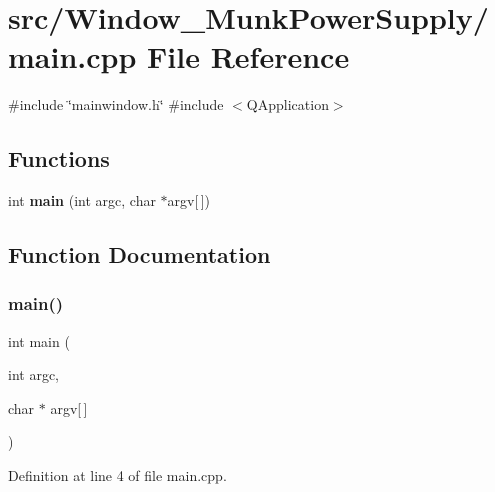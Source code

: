 \section{src/\+Window\+\_\+\+Munk\+Power\+Supply/main.cpp File Reference}
\label{_window___munk_power_supply_2main_8cpp}
{\ttfamily \#include \char`\"{}mainwindow.\+h\char`\"{}}\newline
{\ttfamily \#include $<$Q\+Application$>$}\newline
\subsection*{Functions}
\begin{DoxyCompactItemize}
\item 
int \textbf{ main} (int argc, char $\ast$argv[$\,$])
\end{DoxyCompactItemize}


\subsection{Function Documentation}
\mbox{\label{_window___munk_power_supply_2main_8cpp_a0ddf1224851353fc92bfbff6f499fa97}} 
\subsubsection{main()}
{\footnotesize\ttfamily int main (\begin{DoxyParamCaption}\item[{int}]{argc,  }\item[{char $\ast$}]{argv[$\,$] }\end{DoxyParamCaption})}



Definition at line 4 of file main.\+cpp.

